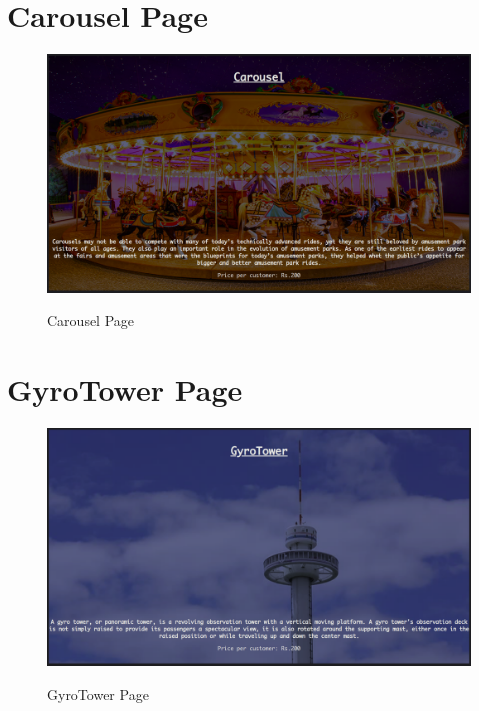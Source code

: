 \section{Carousel Page}
\begin{figure}[H]
\caption{Carousel Page}
\includegraphics[scale=.20]{./car.png}
\\[0.2in]
\label{fig:Carousel Page}
\end{figure}

\thispagestyle{fancy}


\section{GyroTower Page}
\begin{figure}[H]
\caption{GyroTower Page}
\includegraphics[scale=.20]{./drp.png}
\\[0.2in]
\label{fig:GyroTower Page}
\end{figure}

\thispagestyle{fancy}
